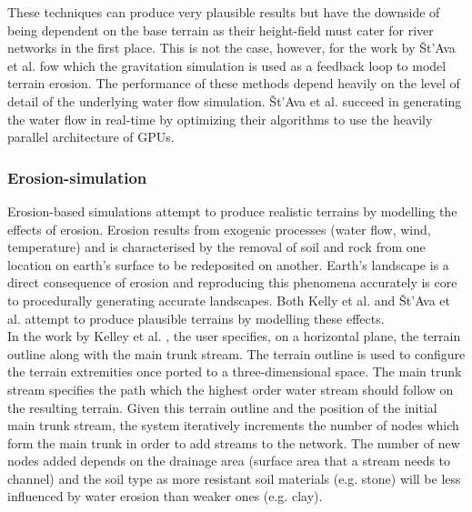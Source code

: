 These techniques can produce very plausible results but have the downside of being dependent on the base terrain as their height-field must cater for river networks in the first place. This is not the case, however, for the work by Št'Ava et al. \cite{StAva2008} fow which the gravitation simulation is used as a feedback loop to model terrain erosion. The performance of these methods depend heavily on the level of detail of the underlying water flow simulation. Št'Ava et al. \cite{StAva2008} succeed in generating the water flow in real-time by optimizing their algorithms to use the heavily parallel architecture of GPUs.

\subsubsection{Erosion-simulation}

Erosion-based simulations attempt to produce realistic terrains by modelling the effects of erosion. Erosion results from exogenic processes (water flow, wind, temperature) and is characterised by the removal of soil and rock from one location on earth's surface to be redeposited on another. Earth's landscape is a direct consequence of erosion and reproducing this phenomena accurately is core to procedurally generating accurate landscapes. Both Kelly et al. \cite{Kelley1988} and Št'Ava et al. \cite{StAva2008} attempt to produce plausible terrains by modelling these effects.\\

In the work by Kelley et al. \cite{Kelley1988}, the user specifies, on a horizontal plane, the terrain outline along with the main trunk stream. The terrain outline is used to configure the terrain extremities once ported to a three-dimensional space. The main trunk stream specifies the path which the highest order water stream should follow on the resulting terrain. Given this terrain outline and the position of the initial main trunk stream, the system iteratively increments the number of nodes which form the main trunk in order to add streams to the network. The number of new nodes added depends on the drainage area (surface area that a stream needs to channel) and the soil type as more resistant soil materials (e.g. stone) will be less influenced by water erosion than weaker ones (e.g. clay). \\

